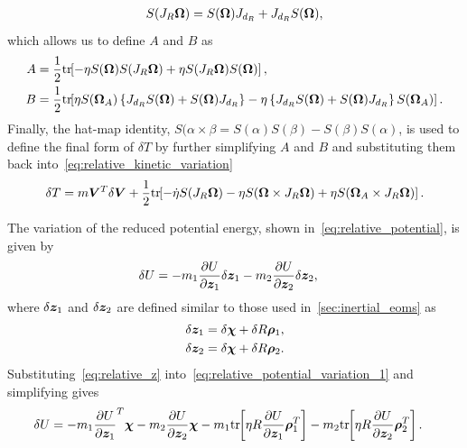 \begin{align}
    S(J_R \bm{\Omega}) = S(\bm{\Omega}) J_{d_{R}} + J_{d_{R}} S(\bm{\Omega}) , 
\end{align}
which allows us to define \( A \) and \( B \) as 
\begin{align*}
    A &= \frac{1}{2} \mathrm{tr}\negthickspace\left[  - \eta S(\bm{\Omega}) S(J_R \bm{\Omega}) + \eta S(J_R \bm{\Omega}) S(\bm{\Omega}) \right] , \\
    B &= \frac{1}{2} \mathrm{tr}\negthickspace\left[  \eta S(\bm{\Omega}_A) \left\{ J_{d_{R}} S(\bm{\Omega}) + S(\bm{\Omega}) J_{d_{R}} \right\} - \eta \left\{ J_{d_{R}} S(\bm{\Omega}) + S(\bm{\Omega}) J_{d_{R}}  \right\} S(\bm{\Omega}_A) \right] .
\end{align*}
Finally, the hat-map identity, \( S(\alpha \times \beta  = S(\alpha) S(\beta) - S(\beta) S(\alpha)\), is used to define the final form of \(\delta T\) by further simplifying \( A \) and \(B \) and substituting them back into~\cref{eq:relative_kinetic_variation} 
\begin{align}\label{eq:deltaT_relative}
    \delta T = m \bm{V}^T \delta \bm{V} + \frac{1}{2} \mathrm{tr}\negthickspace\left[ - \dot{\eta} S(J_R \bm{\Omega}) - \eta S(\bm{\Omega} \times J_R \bm{\Omega}) + \eta S(\bm{\Omega}_A \times J_R \bm{\Omega}) \right] .
\end{align}


The variation of the reduced potential energy, shown in~\cref{eq:relative_potential}, is given by
\begin{align}\label{eq:relative_potential_variation_1}
    \delta U &= -m_1 \frac{\partial U}{\partial \bm{z}_1} \delta \bm{z}_1 - m_2 \frac{\partial U}{\partial \bm{z}_2} \delta \bm{z}_2 ,
\end{align}
where \( \delta \bm{z}_1 \) and \( \delta \bm{z}_2\) are defined similar to those used in~\cref{sec:inertial_eoms} as 
\begin{align}\label{eq:relative_z}
    \delta \bm{z}_1 &= \delta \bm{\chi} + \delta R \bm{\rho}_1 , \\
    \delta \bm{z}_2 &= \delta \bm{\chi} + \delta R \bm{\rho}_2 .
\end{align}
Substituting~\cref{eq:relative_z} into~\cref{eq:relative_potential_variation_1} and simplifying gives
\begin{align}\label{eq:relative_potential_varation}
    \delta U &= -m_1 \frac{\partial U}{\partial \bm{z}_1}^T \bm{\chi} - m_2 \frac{\partial U}{\partial \bm{z}_2} \bm{\chi} - m_1 \mathrm{tr}\negthickspace\left[ \eta R \frac{\partial U}{\partial \bm{z}_1} \bm{\rho}_1^T \right] - m_2 \mathrm{tr}\negthickspace\left[ \eta R \frac{\partial U}{\partial \bm{z}_2} \bm{\rho}_2^T \right] .
\end{align}

